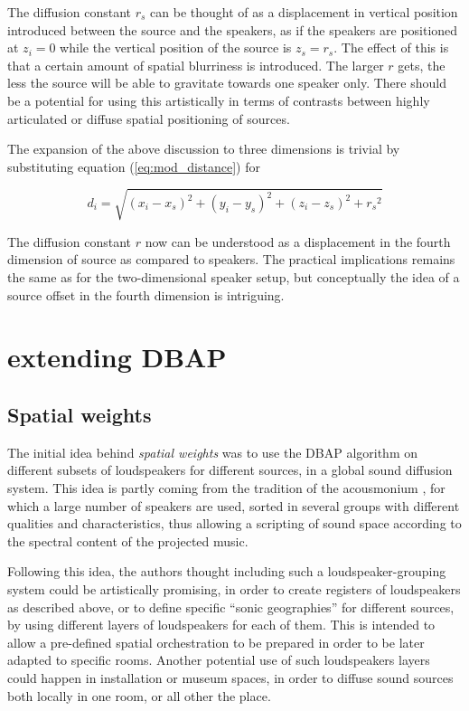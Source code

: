 \documentclass[twoside,10pt]{article}
\begin{document}
The diffusion constant $r_{s}$ can be thought of as a displacement in vertical position introduced between the source and the speakers, as if the speakers are positioned at $z_{i}=0$ while the vertical position of the source is $z_{s}=r_{s}$. The effect of this is that a certain amount of spatial blurriness is introduced. The larger $r$ gets, the less the source will be able to gravitate towards one speaker only. There should be a potential for using this artistically in terms of contrasts between highly articulated or diffuse spatial positioning of sources.

The expansion of the above discussion to three dimensions is trivial by substituting equation (\ref{eq:mod_distance}) for

\begin{equation} \label{eq:3D_mod_distance}
d_{i} = \sqrt{ {(x_{i} - x_{s})}^2 + {(y_{i} - y_{s})}^2 + {(z_{i} - z_{s})}^2 + {r_{s}}^2}
\end{equation}

The diffusion constant $r$ now can be understood as a displacement in the fourth dimension of source as compared to speakers. The practical implications remains the same as for the two-dimensional speaker setup, but conceptually the idea of a source offset in the fourth dimension is intriguing.

%
%

\section{extending DBAP}

\subsection{Spatial weights}

The initial idea behind \textit{spatial weights} was to use the DBAP algorithm on different subsets of loudspeakers for different sources, in a global sound diffusion system. This idea is partly coming from the tradition of the acousmonium \cite{Bayle:1993MusiqueAcousmatique}, for which a large number of speakers are used, sorted in several groups with different qualities and characteristics, thus allowing a scripting of sound space according to the spectral content of the projected music\cite{Prager:2002acousmatique}.

Following this idea, the authors thought including such a loudspeaker-grouping system could be artistically promising, in order to create registers of loudspeakers as described above, or to define specific ``sonic geographies'' for different sources, by using different layers of loudspeakers for each of them. This is intended to allow a pre-defined spatial orchestration to be prepared in order to be later adapted to specific rooms\cite{Lyon:2008spatial_orchestration}. Another potential use of such loudspeakers layers could happen in installation or museum spaces, in order to diffuse sound sources both locally in one room, or all other the place.
\end{document}
